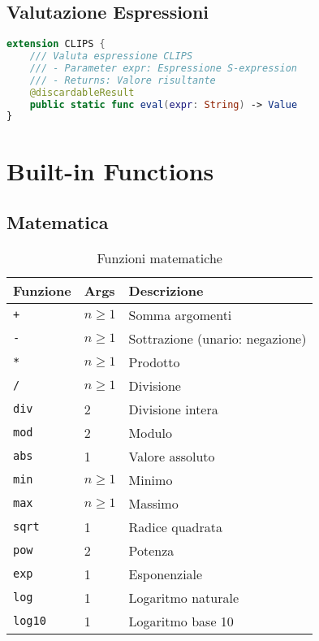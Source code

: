 \subsection{Valutazione Espressioni}

\begin{lstlisting}[language=Swift]
extension CLIPS {
    /// Valuta espressione CLIPS
    /// - Parameter expr: Espressione S-expression
    /// - Returns: Valore risultante
    @discardableResult
    public static func eval(expr: String) -> Value
}
\end{lstlisting}

\section{Built-in Functions}

\subsection{Matematica}

\begin{table}[h]
\centering
\small
\begin{tabular}{@{}llp{6cm}@{}}
\toprule
\textbf{Funzione} & \textbf{Args} & \textbf{Descrizione} \\
\midrule
\texttt{+} & $n \geq 1$ & Somma argomenti \\
\texttt{-} & $n \geq 1$ & Sottrazione (unario: negazione) \\
\texttt{*} & $n \geq 1$ & Prodotto \\
\texttt{/} & $n \geq 1$ & Divisione \\
\texttt{div} & 2 & Divisione intera \\
\texttt{mod} & 2 & Modulo \\
\texttt{abs} & 1 & Valore assoluto \\
\texttt{min} & $n \geq 1$ & Minimo \\
\texttt{max} & $n \geq 1$ & Massimo \\
\texttt{sqrt} & 1 & Radice quadrata \\
\texttt{pow} & 2 & Potenza \\
\texttt{exp} & 1 & Esponenziale \\
\texttt{log} & 1 & Logaritmo naturale \\
\texttt{log10} & 1 & Logaritmo base 10 \\
\bottomrule
\end{tabular}
\caption{Funzioni matematiche}
\label{tab:api_math}
\end{table}

